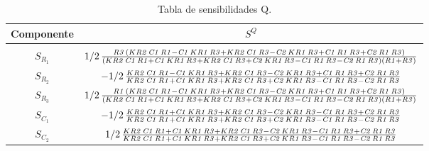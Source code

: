 \begin{table}[H]
\centering
\begin{tabular}{cc}
Componente & $S^{Q}$ \\ \hline\\
$S_{R_1}$  & $1/2\,{\frac {{\it R3}\, \left( K{\it R2}\,{\it C1}\,{\it R1}-{\it C1}
\,K{\it R1}\,{\it R3}+K{\it R2}\,{\it C1}\,{\it R3}-{\it C2}\,K{\it R1
}\,{\it R3}+{\it C1}\,{\it R1}\,{\it R3}+{\it C2}\,{\it R1}\,{\it R3}
 \right) }{ \left( K{\it R2}\,{\it C1}\,{\it R1}+{\it C1}\,K{\it R1}\,
{\it R3}+K{\it R2}\,{\it C1}\,{\it R3}+{\it C2}\,K{\it R1}\,{\it R3}-{
\it C1}\,{\it R1}\,{\it R3}-{\it C2}\,{\it R1}\,{\it R3} \right) 
 \left( {\it R1}+{\it R3} \right) }}$ \\
$S_{R_2}$  & $-1/2\,{\frac {K{\it R2}\,{\it C1}\,{\it R1}-{\it C1}\,K{\it R1}\,{\it 
R3}+K{\it R2}\,{\it C1}\,{\it R3}-{\it C2}\,K{\it R1}\,{\it R3}+{\it 
C1}\,{\it R1}\,{\it R3}+{\it C2}\,{\it R1}\,{\it R3}}{K{\it R2}\,{\it 
C1}\,{\it R1}+{\it C1}\,K{\it R1}\,{\it R3}+K{\it R2}\,{\it C1}\,{\it 
R3}+{\it C2}\,K{\it R1}\,{\it R3}-{\it C1}\,{\it R1}\,{\it R3}-{\it C2
}\,{\it R1}\,{\it R3}}}$ \\
$S_{R_3}$  & $1/2\,{\frac {{\it R1}\, \left( K{\it R2}\,{\it C1}\,{\it R1}-{\it C1}
\,K{\it R1}\,{\it R3}+K{\it R2}\,{\it C1}\,{\it R3}-{\it C2}\,K{\it R1
}\,{\it R3}+{\it C1}\,{\it R1}\,{\it R3}+{\it C2}\,{\it R1}\,{\it R3}
 \right) }{ \left( K{\it R2}\,{\it C1}\,{\it R1}+{\it C1}\,K{\it R1}\,
{\it R3}+K{\it R2}\,{\it C1}\,{\it R3}+{\it C2}\,K{\it R1}\,{\it R3}-{
\it C1}\,{\it R1}\,{\it R3}-{\it C2}\,{\it R1}\,{\it R3} \right) 
 \left( {\it R1}+{\it R3} \right) }}$ \\
$S_{C_1}$  & $-1/2\,{\frac {K{\it R2}\,{\it C1}\,{\it R1}+{\it C1}\,K{\it R1}\,{\it 
R3}+K{\it R2}\,{\it C1}\,{\it R3}-{\it C2}\,K{\it R1}\,{\it R3}-{\it 
C1}\,{\it R1}\,{\it R3}+{\it C2}\,{\it R1}\,{\it R3}}{K{\it R2}\,{\it 
C1}\,{\it R1}+{\it C1}\,K{\it R1}\,{\it R3}+K{\it R2}\,{\it C1}\,{\it 
R3}+{\it C2}\,K{\it R1}\,{\it R3}-{\it C1}\,{\it R1}\,{\it R3}-{\it C2
}\,{\it R1}\,{\it R3}}}$ \\
$S_{C_2}$  & $1/2\,{\frac {K{\it R2}\,{\it C1}\,{\it R1}+{\it C1}\,K{\it R1}\,{\it 
R3}+K{\it R2}\,{\it C1}\,{\it R3}-{\it C2}\,K{\it R1}\,{\it R3}-{\it 
C1}\,{\it R1}\,{\it R3}+{\it C2}\,{\it R1}\,{\it R3}}{K{\it R2}\,{\it 
C1}\,{\it R1}+{\it C1}\,K{\it R1}\,{\it R3}+K{\it R2}\,{\it C1}\,{\it 
R3}+{\it C2}\,K{\it R1}\,{\it R3}-{\it C1}\,{\it R1}\,{\it R3}-{\it C2
}\,{\it R1}\,{\it R3}}}$
\end{tabular}
\caption{Tabla de sensibilidades Q.}
\end{table}
